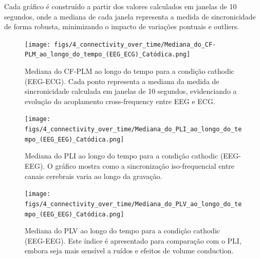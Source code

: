 Cada gráfico é construído a partir dos valores calculados em janelas de 10 segundos, onde a mediana de cada janela representa a medida de sincronicidade de forma robusta, minimizando o impacto de variações pontuais e outliers.

\begin{figure}[htb]
    \centering
    \texttt{[image: figs/4\_connectivity\_over\_time/Mediana\_do\_CF-PLM\_ao\_longo\_do\_tempo\_(EEG\_ECG)\_Catódica.png]}
    \caption{Mediana do CF-PLM ao longo do tempo para a condição cathodic (EEG-ECG). Cada ponto representa a mediana da medida de sincronicidade calculada em janelas de 10 segundos, evidenciando a evolução do acoplamento cross-frequency entre EEG e ECG.}
    \label{fig:cfplm_time_cat}
\end{figure}

\begin{figure}[htb]
    \centering
    \texttt{[image: figs/4\_connectivity\_over\_time/Mediana\_do\_PLI\_ao\_longo\_do\_tempo\_(EEG\_EEG)\_Catódica.png]}
    \caption{Mediana do PLI ao longo do tempo para a condição cathodic (EEG-EEG). O gráfico mostra como a sincronização iso-frequencial entre canais cerebrais varia ao longo da gravação.}
    \label{fig:pli_time_cat}
\end{figure}

\begin{figure}[htb]
    \centering
    \texttt{[image: figs/4\_connectivity\_over\_time/Mediana\_do\_PLV\_ao\_longo\_do\_tempo\_(EEG\_EEG)\_Catódica.png]}
    \caption{Mediana do PLV ao longo do tempo para a condição cathodic (EEG-EEG). Este índice é apresentado para comparação com o PLI, embora seja mais sensível a ruídos e efeitos de volume conduction.}
    \label{fig:plv_time_cat}
\end{figure}